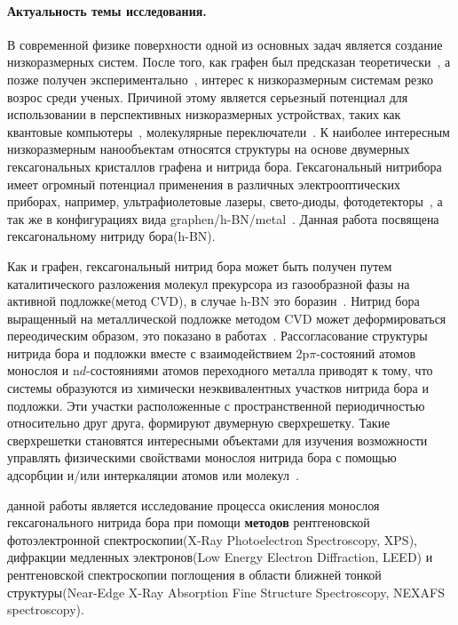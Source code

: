 
{\actuality} 
\paragraph{Актуальность темы исследования.}
В современной физике поверхности одной из основных задач является
создание низкоразмерных систем. После того, как графен был предсказан
теоретически~\cite{Wallace1947,McClure1956,Slonczewski1958}, а позже получен экспериментально~\cite{Novoselov2004}, интерес к 
низкоразмерным системам резко возрос среди ученых. Причиной этому является
серьезный потенциал для использовании в перспективных низкоразмерных 
устройствах, таких как квантовые компьютеры~\cite{Barends2014}, молекулярные переключатели~\cite{G.Joachim2000,Nitzan2003}. 
К наиболее интересным низкоразмерным нанообъектам относятся структуры на 
основе двумерных гексагональных кристаллов графена и нитрида бора.
Гексагональный нитрибора имеет огромный потенциал применения в различных
электрооптических приборах, например, ультрафиолетовые лазеры, 
свето-диоды, фотодетекторы~\cite{Zheng2008}, а так же в
конфигурациях вида graphen/h-BN/metal~\cite{Kamalakar2014,Kamalakar2016,Usachev_doc}.
Данная работа посвящена гексагональному нитриду бора(h-BN). 


Как и графен, гексагональный нитрид бора может быть получен путем каталитического разложения молекул прекурсора из газообразной 
фазы на активной подложке(метод CVD), в случае h-BN это
боразин~\cite{Kidambi2014,Paffett1990}. Нитрид бора выращенный на
металлической подложке методом CVD может деформироваться
переодическим образом, это показано в работах~\cite{Preobrajenski2008_Adsorption-inducedgapstatesofh-BNonmetalsurfaces,Brugger2009,Nagashima1995,Weng2016}. Рассогласование структуры нитрида
бора и подложки вместе с взаимодействием 2p$\pi$-состояний атомов монослоя
и n$d$-состояниями атомов переходного металла приводят к тому, что 
системы образуются из химически неэквивалентных участков нитрида бора и подложки.
Эти участки расположенные с пространственной периодичностью 
относительно друг друга, формируют двумерную сверхрешетку. Такие
сверхрешетки становятся интересными объектами для изучения возможности
управлять физическими свойствами монослоя нитрида бора с помощью
адсорбции и/или интеркаляции атомов или молекул~\cite{Ataca2010}.


{\aim} данной работы является исследование процесса окисления 
монослоя гексагонального нитрида бора при помощи \textbf{методов} 
рентгеновской фотоэлектронной спектроскопии(X-Ray Photoelectron 
Spectroscopy, XPS), дифракции медленных электронов(Low Energy 
Electron Diffraction, LEED) и рентгеновской спектроскопии
поглощения в области ближней тонкой структуры(Near-Edge 
X-Ray Absorption Fine Structure Spectroscopy, NEXAFS
spectroscopy). 

